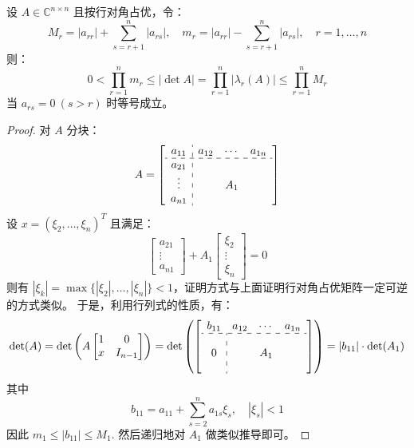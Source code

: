\begin{theorem}[行对角占优阵的行列式的上下界]
设 $A\in\mathbb C^{n\times n}$ 且按行对角占优，令：
\[
    M_r=|a_{rr}|+\sum_{s=r+1}^n|a_{rs}|,\quad m_r=|a_{rr}|-\sum_{s=r+1}^n|a_{rs}|,\quad r=1,\ldots,n
\]
则：
\[
    0<\prod_{r=1}^n m_r\leq |\det A|=\prod_{r=1}^n|\lambda_r(A)|\leq\prod_{r=1}^n M_r
\]
当 $a_{rs}=0\ (s>r)$ 时等号成立。
\end{theorem}
\begin{proof}
对 $A$ 分块：
\[
    A=\left[\begin{array}{c:ccc}
    a_{11}&a_{12}&\cdots&a_{1n}\\
    \hdashline a_{21}&&&\\
    \vdots&&A_1&\\
    a_{n1}&&&\\
    \end{array}\right]
\]
设 $x=(\xi_2,\ldots,\xi_n)^T$ 且满足：
\[
    \begin{bmatrix}a_{21}\\\vdots\\a_{n1}\end{bmatrix}+A_1\begin{bmatrix}\xi_2\\\vdots\\\xi_n\end{bmatrix}=0
\]
则有 $|\xi_k|=\max\{|\xi_2|,\ldots,|\xi_n|\}<1$，证明方式与上面证明行对角占优矩阵一定可逆的方式类似。
于是，利用行列式的性质，有：
\[
    \det(A)=\det\left(A\begin{bmatrix}1&0\\x&I_{n-1}\end{bmatrix}\right)=\det\left(
    \left[\begin{array}{c:ccc}
    b_{11}&a_{12}&\cdots&a_{1n}\\
    \hdashline&&&\\
    0&&A_1&\\
    &&&
    \end{array}\right]
    \right)=|b_{11}|\cdot\det(A_1)
\]
其中
\[
    b_{11}=a_{11}+\sum_{s=2}^na_{1s}\xi_s,\quad|\xi_s|<1
\]
因此 $m_1\leq|b_{11}|\leq M_1$.  然后递归地对 $A_1$ 做类似推导即可。
\end{proof}

